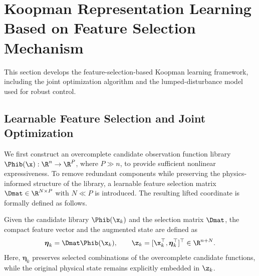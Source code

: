 \section{Koopman Representation Learning Based on Feature Selection Mechanism}
\label{sec:koopman}

This section develops the feature-selection-based Koopman learning framework, including the joint optimization algorithm and the lumped-disturbance model used for robust control.

\subsection{Learnable Feature Selection and Joint Optimization}
\label{subsec:algorithm}
We first construct an overcomplete candidate observation function library $\Phib(\x):\R^n\to\R^P$, where $P\gg n$, to provide sufficient nonlinear expressiveness. To remove redundant components while preserving the physics-informed structure of the library, a learnable feature selection matrix $\Dmat\in\R^{N\times P}$ with $N\ll P$ is introduced. The resulting lifted coordinate is formally defined as follows.

{
\begin{definition}
Given the candidate library $\Phib(\x_k)$ and the selection matrix $\Dmat$, the compact feature vector and the augmented state are defined as
\begin{equation}
\boldsymbol{\eta}_k = \Dmat\Phib(\x_k), \qquad
\z_k = [\x_k^\top, \boldsymbol{\eta}_k^\top]^\top \in \R^{n+N}.
\end{equation}
Here, $\boldsymbol{\eta}_k$ preserves selected combinations of the overcomplete candidate functions, while the original physical state remains explicitly embedded in $\z_k$.
\end{definition}
}

